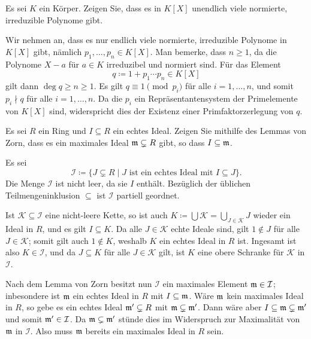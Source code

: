 \begin{question}[subtitle = Euklid]
  Es sei $K$ ein Körper.
  Zeigen Sie, dass es in $K[X]$ unendlich viele normierte, irreduzible Polynome gibt.
\end{question}


\begin{solution}
  Wir nehmen an, dass es nur endlich viele normierte, irreduzible Polynome in $K[X]$ gibt, nämlich $p_1, \dotsc, p_n \in K[X]$.
  Man bemerke, dass $n \geq 1$, da die Polynome $X - a$ für $a \in K$ irreduzibel und normiert sind.
  Für das Element
  \[
    q \coloneqq 1 + p_1 \dotsm p_n \in K[X]
  \]
  gilt dann $\deg q \geq n \geq 1$.
  Es gilt $q \equiv 1 \pmod{p_i}$ für alle $i = 1, \dotsc, n$, und somit $p_i \nmid q$ für alle $i = 1, \dotsc, n$.
  Da die $p_i$ ein Repräsentantensystem der Primelemente von $K[X]$ sind, widerspricht dies der Existenz einer Primfaktorzerlegung von $q$.
\end{solution}



\begin{question}
  Es sei $R$ ein Ring und $I \subseteq R$ ein echtes Ideal.
  Zeigen Sie mithilfe des Lemmas von Zorn, dass es ein maximales Ideal $\mathfrak{m} \subsetneq R$ gibt, so dass $I \subseteq \mathfrak{m}$.
\end{question}


\begin{solution}
  Es sei
  \[
              \mathcal{I}
    \coloneqq \{J \subsetneq R \mid \text{$J$ ist ein echtes Ideal mit $I \subseteq J$}\}.
  \]
  Die Menge $\mathcal{I}$ ist nicht leer, da sie $I$ enthält.
  Bezüglich der üblichen Teilmengeninklusion $\subseteq$ ist $\mathcal{I}$ partiell geordnet.
  
  Ist $\mathcal{K} \subseteq \mathcal{I}$ eine nicht-leere Kette, so ist auch $K \coloneqq \bigcup \mathcal{K} = \bigcup_{J \in \mathcal{K}} J$ wieder ein Ideal in $R$, und es gilt $I \subseteq K$.
  Da alle $J \in \mathcal{K}$ echte Ideale sind, gilt $1 \notin J$ für alle $J \in \mathcal{K}$;
  somit gilt auch $1 \notin K$, weshalb $K$ ein echtes Ideal in $R$ ist.
  Ingesamt ist also $K \in \mathcal{I}$, und da $J \subseteq K$ für alle $J \in \mathcal{K}$ gilt, ist $K$ eine obere Schranke für $\mathcal{K}$ in $\mathcal{I}$.
  
  Nach dem Lemma von Zorn besitzt nun $\mathcal{I}$ ein maximales Element $\mathfrak{m} \in \mathcal{I}$;
  inbesondere ist $\mathfrak{m}$ ein echtes Ideal in $R$ mit $I \subseteq \mathfrak{m}$.
  Wäre $\mathfrak{m}$ kein maximales Ideal in $R$, so gebe es ein echtes Ideal $\mathfrak{m}' \subsetneq R$ mit $\mathfrak{m} \subsetneq \mathfrak{m}'$.
  Dann wäre aber $I \subseteq \mathfrak{m} \subsetneq \mathfrak{m}'$ und somit $\mathfrak{m}' \in \mathcal{I}$. Da $\mathfrak{m} \subsetneq \mathfrak{m}'$ stünde dies im Widerspruch zur Maximalität von $\mathfrak{m}$ in $\mathcal{I}$.
  Also muss $\mathfrak{m}$ bereits ein maximales Ideal in $R$ sein.
\end{solution}


